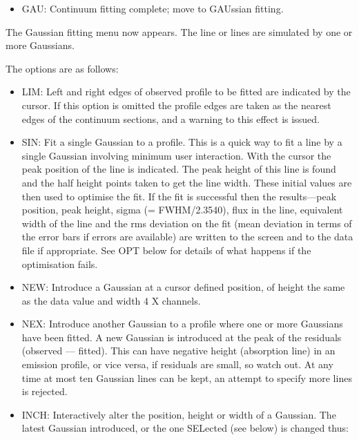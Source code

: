 \documentclass[11pt,twoside]{article}
\newcommand{\latorhtm}[2]{#1}
\newcommand{\latorhtm}[2]{#2}
\begin{document}
\begin{itemize}
\item
   GAU: Continuum fitting complete; move to GAUssian fitting.
\end{itemize}

   The Gaussian fitting menu now appears. The line or lines are
   simulated by one or more Gaussians.

   The options are as follows:

\begin{itemize}
\item
   LIM: Left and right edges of observed profile to be fitted are
   indicated by the cursor. If this option is omitted the profile edges
   are taken as the nearest edges of the continuum sections, and a
   warning to this effect is issued.

\item
   SIN: Fit a single Gaussian to a profile. This is a quick way to fit a
   line by a single Gaussian involving minimum user interaction. With
   the cursor the peak position of the line is indicated. The peak
   height of this line is found and the half height points taken to get
   the line width. These initial values are then used to optimise the
   fit. If the fit is successful then the results\latorhtm{---}{-}peak
   position, peak
   height, sigma (= FWHM/2.3540), flux in the line, equivalent width of
   the line and the rms deviation on the fit (mean deviation in terms of
   the error bars if errors are available) are written to the screen and
   to the data file if appropriate. See OPT below for details of what
   happens if the optimisation fails.

\item
   NEW: Introduce a Gaussian at a cursor defined position, of height the
   same as the data value and width 4 X channels.

\item
   NEX: Introduce another Gaussian to a profile where one or more
   Gaussians have been fitted. A new Gaussian is introduced at the peak
   of the residuals (observed \latorhtm{---}{-} fitted). This can have
   negative height
   (absorption line) in an emission profile, or vice versa, if residuals
   are small, so watch out. At any time at most ten Gaussian lines can
   be kept, an attempt to specify more lines is rejected.

\item
   INCH: Interactively alter the position, height or width of a
   Gaussian. The latest Gaussian introduced, or the one SELected (see
   below) is changed thus:


\end{itemize}
\end{document}

